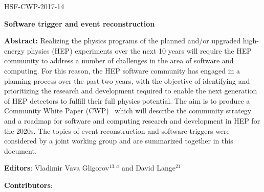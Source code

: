 \begin{flushright}
HSF-CWP-2017-14
\end{flushright}

\Large
\begin{center}
{\bf Software trigger and event reconstruction}
\end{center}
\vskip 1cm

\normalsize


\hangindent=1cm
{\bf Abstract:} Realizing the physics programs of the planned and/or upgraded high-energy physics (HEP) experiments over the next 10 years will require the HEP community to address a number of challenges in the area of software and computing. For this reason, the HEP software community has engaged in a planning process over the past two years, with the objective of identifying and prioritizing the research and development required to enable the next generation of HEP detectors to fulfill their full physics potential. The aim is to produce a Community White Paper (CWP)~\cite{HSF2017} which will describe the community strategy and a roadmap for software and computing research and development in HEP for the 2020s. The topics of event reconstruction and software triggers were considered by a joint working group and are summarized together in this document.

\vskip 1cm


\hangindent=1cm
{\bf Editors}: Vladimir Vava Gligorov$^{13,a}$ and David Lange$^{21}$

\vskip 0.2cm
\hangindent=1cm
{\bf Contributors}:


